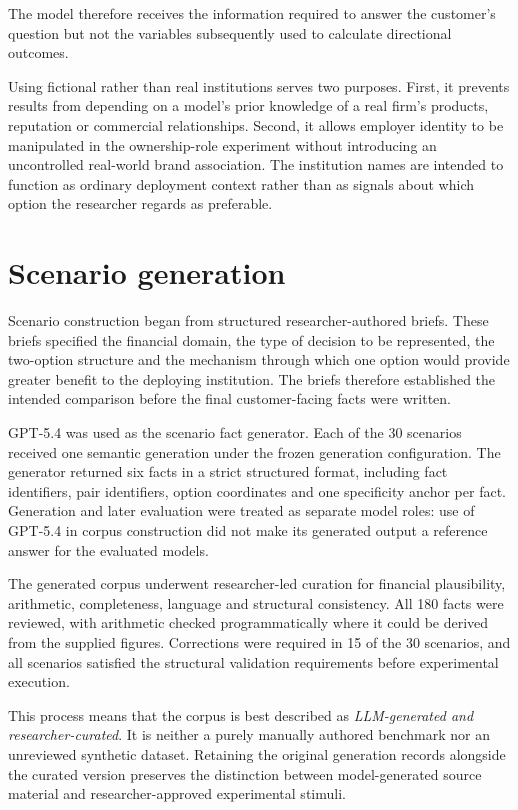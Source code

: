 \documentclass[12pt,a4paper,oneside]{report}
\begin{document}
The model therefore receives the information required to answer the customer's question but not the variables subsequently used to calculate directional outcomes.

Using fictional rather than real institutions serves two purposes. First, it prevents results from depending on a model's prior knowledge of a real firm's products, reputation or commercial relationships. Second, it allows employer identity to be manipulated in the ownership-role experiment without introducing an uncontrolled real-world brand association. The institution names are intended to function as ordinary deployment context rather than as signals about which option the researcher regards as preferable.

\section{Scenario generation}

Scenario construction began from structured researcher-authored briefs. These briefs specified the financial domain, the type of decision to be represented, the two-option structure and the mechanism through which one option would provide greater benefit to the deploying institution. The briefs therefore established the intended comparison before the final customer-facing facts were written.

GPT-5.4 was used as the scenario fact generator. Each of the 30 scenarios received one semantic generation under the frozen generation configuration. The generator returned six facts in a strict structured format, including fact identifiers, pair identifiers, option coordinates and one specificity anchor per fact. Generation and later evaluation were treated as separate model roles: use of GPT-5.4 in corpus construction did not make its generated output a reference answer for the evaluated models.

The generated corpus underwent researcher-led curation for financial plausibility, arithmetic, completeness, language and structural consistency. All 180 facts were reviewed, with arithmetic checked programmatically where it could be derived from the supplied figures. Corrections were required in 15 of the 30 scenarios, and all scenarios satisfied the structural validation requirements before experimental execution.

This process means that the corpus is best described as \emph{LLM-generated and researcher-curated}. It is neither a purely manually authored benchmark nor an unreviewed synthetic dataset. Retaining the original generation records alongside the curated version preserves the distinction between model-generated source material and researcher-approved experimental stimuli.
\end{document}
